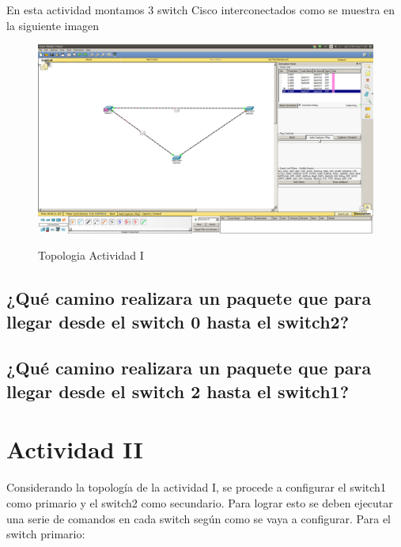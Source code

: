 \documentclass[spanish]{udpreport}
\begin{document}
En esta actividad montamos 3 switch Cisco interconectados como se muestra en la siguiente imagen 
\begin{figure}[H]
	\caption{Topologia Actividad I}
	\centering
	\includegraphics[scale=.25, bb=0 0 30 30]{imagenes/A1.png}
	\label{fig:Figura 2.1}
	\linebreak
\end{figure}

\subsection{¿Qué camino realizara un paquete que para llegar desde el switch
0 hasta el switch2?}

\subsection{¿Qué camino realizara un paquete que para llegar desde el switch
2 hasta el switch1?}


\section{Actividad II}
Considerando la topología de la actividad I, se procede a configurar el switch1 como primario y el switch2 como secundario. Para lograr esto se deben ejecutar una serie de comandos en cada switch según como se vaya a configurar.
Para el switch primario:
\end{document}
